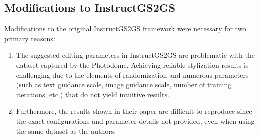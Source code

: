 \subsection{Modifications to InstructGS2GS}
\label{sec:modifications}
Modifications to the original InstructGS2GS framework were necessary for two primary reasons:
\begin{enumerate}
	\item The suggested editing parameters in InstructGS2GS are problematic with the dataset captured by the Photodome. Achieving reliable stylization results is challenging due to the elements of randomization and numerous parameters (such as text guidance scale, image guidance scale, number of training iterations, etc.) that do not yield intuitive results.
	\item Furthermore, the results shown in their paper are difficult to reproduce since the exact configurations and parameter details not provided, even when using the same dataset as the authors.
\end{enumerate}

